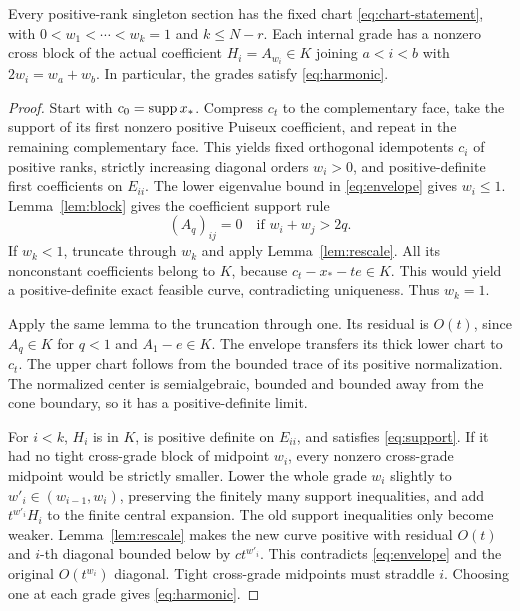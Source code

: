 \begin{proposition}\label{prop:chart}
Every positive-rank singleton section has the fixed chart \eqref{eq:chart-statement}, with $0<w_1<\cdots<w_k=1$ and $k\le N-r$. Each internal grade has a nonzero cross block of the actual coefficient $H_i=A_{w_i}\in K$ joining $a<i<b$ with $2w_i=w_a+w_b$. In particular, the grades satisfy \eqref{eq:harmonic}.
\end{proposition}
\begin{proof}
Start with $c_0=\operatorname{supp} x_*$. Compress $c_t$ to the complementary face, take the support of its first nonzero positive Puiseux coefficient, and repeat in the remaining complementary face. This yields fixed orthogonal idempotents $c_i$ of positive ranks, strictly increasing diagonal orders $w_i>0$, and positive-definite first coefficients on $E_{ii}$. The lower eigenvalue bound in \eqref{eq:envelope} gives $w_i\le1$. Lemma~\ref{lem:block} gives the coefficient support rule
\begin{equation}\label{eq:support}
 (A_q)_{ij}=0\quad\text{if }w_i+w_j>2q.
\end{equation}
If $w_k<1$, truncate through $w_k$ and apply Lemma~\ref{lem:rescale}. All its nonconstant coefficients belong to $K$, because $c_t-x_*-te\in K$. This would yield a positive-definite exact feasible curve, contradicting uniqueness. Thus $w_k=1$.

Apply the same lemma to the truncation through one. Its residual is $O(t)$, since $A_q\in K$ for $q<1$ and $A_1-e\in K$. The envelope transfers its thick lower chart to $c_t$. The upper chart follows from the bounded trace of its positive normalization. The normalized center is semialgebraic, bounded and bounded away from the cone boundary, so it has a positive-definite limit.

For $i<k$, $H_i$ is in $K$, is positive definite on $E_{ii}$, and satisfies \eqref{eq:support}. If it had no tight cross-grade block of midpoint $w_i$, every nonzero cross-grade midpoint would be strictly smaller. Lower the whole grade $w_i$ slightly to $w'_i\in(w_{i-1},w_i)$, preserving the finitely many support inequalities, and add $t^{w'_i}H_i$ to the finite central expansion. The old support inequalities only become weaker. Lemma~\ref{lem:rescale} makes the new curve positive with residual $O(t)$ and $i$-th diagonal bounded below by $ct^{w'_i}$. This contradicts \eqref{eq:envelope} and the original $O(t^{w_i})$ diagonal. Tight cross-grade midpoints must straddle $i$. Choosing one at each grade gives \eqref{eq:harmonic}.
\end{proof}

